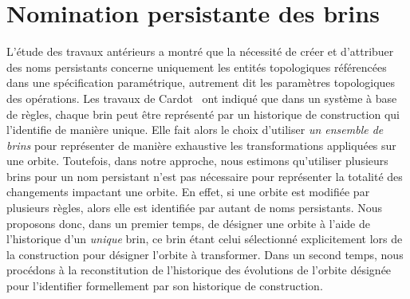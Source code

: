 



\section{Nomination persistante des brins}
\label{sec:reevaluation-nomination-persistante-brins}


L'étude des travaux antérieurs a montré que la nécessité de créer et d'attribuer
des noms persistants concerne uniquement les entités topologiques référencées
dans une spécification paramétrique, autrement dit les paramètres topologiques
des opérations. %
Les travaux de Cardot~\cite{cardot2019} ont indiqué que dans un système à base
de règles, chaque brin peut être représenté par un historique de construction
qui l'identifie de manière unique. %
Elle fait alors le choix d'utiliser \textit{un ensemble de brins} pour
représenter de manière exhaustive les transformations appliquées sur une
orbite. %
Toutefois, dans notre approche, nous estimons qu'utiliser plusieurs
  brins pour un nom persistant n'est pas nécessaire pour représenter la totalité
  des changements impactant une orbite. %
  En effet, si une orbite est modifiée par plusieurs règles, alors elle est
  identifiée par autant de noms persistants. %
Nous proposons donc, dans un premier temps, de désigner une orbite à l'aide de
l'historique d'un \textit{unique} brin, ce brin étant celui sélectionné explicitement
lors de la construction pour désigner l'orbite à transformer. %
Dans un second temps, nous procédons à la reconstitution de l'historique des
évolutions de l'orbite désignée pour l'identifier formellement par son
historique de construction. %

